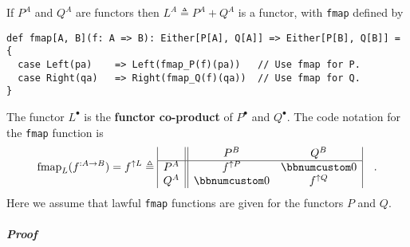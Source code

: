 If $P^{A}$ and $Q^{A}$ are functors then $L^{A}\triangleq P^{A}+Q^{A}$
is a functor, with \lstinline!fmap! defined by
\begin{lstlisting}
def fmap[A, B](f: A => B): Either[P[A], Q[A]] => Either[P[B], Q[B]] = {
  case Left(pa)    => Left(fmap_P(f)(pa))   // Use fmap for P.
  case Right(qa)   => Right(fmap_Q(f)(qa))  // Use fmap for Q.
}
\end{lstlisting}
The functor $L^{\bullet}$ is the \textbf{functor co-product}
of $P^{\bullet}$ and $Q^{\bullet}$. The code notation for the \lstinline!fmap!
function is
\[
\text{fmap}_{L}(f^{:A\rightarrow B})=f^{\uparrow L}\triangleq\begin{array}{|c||cc|}
 & P^{B} & Q^{B}\\
\hline P^{A} & f^{\uparrow P} & \bbnum 0\\
Q^{A} & \bbnum 0 & f^{\uparrow Q}
\end{array}\quad.
\]
Here we assume that lawful \lstinline!fmap! functions are given for
the functors $P$ and $Q$.

\subparagraph{Proof}

